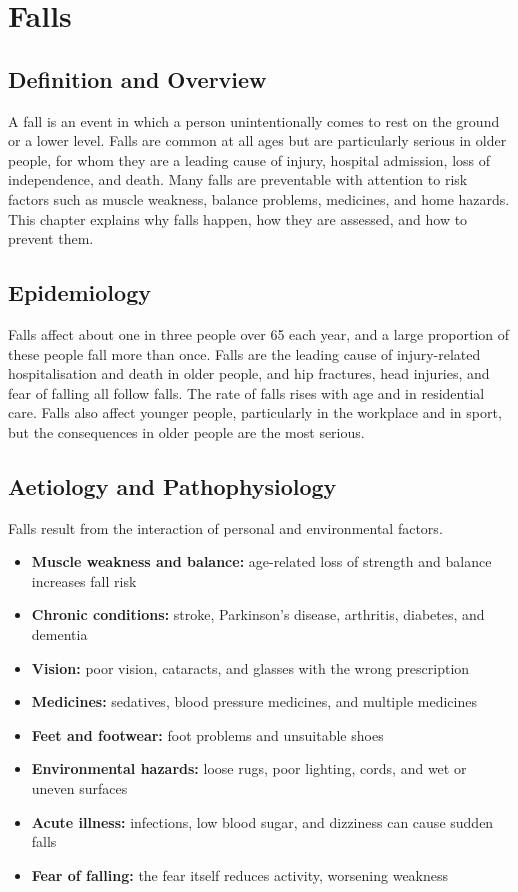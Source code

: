 \chapter{Falls}

\section*{Definition and Overview}
A fall is an event in which a person unintentionally comes to rest on the ground or a lower level. Falls are common at all ages but are particularly serious in older people, for whom they are a leading cause of injury, hospital admission, loss of independence, and death. Many falls are preventable with attention to risk factors such as muscle weakness, balance problems, medicines, and home hazards. This chapter explains why falls happen, how they are assessed, and how to prevent them.

\section*{Epidemiology}
Falls affect about one in three people over 65 each year, and a large proportion of these people fall more than once. Falls are the leading cause of injury-related hospitalisation and death in older people, and hip fractures, head injuries, and fear of falling all follow falls. The rate of falls rises with age and in residential care. Falls also affect younger people, particularly in the workplace and in sport, but the consequences in older people are the most serious.

\section*{Aetiology and Pathophysiology}
Falls result from the interaction of personal and environmental factors.
\begin{itemize}
    \item \textbf{Muscle weakness and balance:} age-related loss of strength and balance increases fall risk
    \item \textbf{Chronic conditions:} stroke, Parkinson's disease, arthritis, diabetes, and dementia
    \item \textbf{Vision:} poor vision, cataracts, and glasses with the wrong prescription
    \item \textbf{Medicines:} sedatives, blood pressure medicines, and multiple medicines
    \item \textbf{Feet and footwear:} foot problems and unsuitable shoes
    \item \textbf{Environmental hazards:} loose rugs, poor lighting, cords, and wet or uneven surfaces
    \item \textbf{Acute illness:} infections, low blood sugar, and dizziness can cause sudden falls
    \item \textbf{Fear of falling:} the fear itself reduces activity, worsening weakness
\end{itemize}

